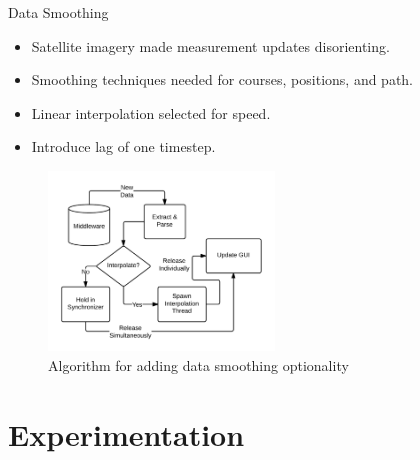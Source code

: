 \documentclass{beamer}
\begin{document}
    \begin{frame}{Data Smoothing}
          \begin{itemize} \footnotesize
            \item Satellite imagery made measurement updates disorienting.
            \item Smoothing techniques needed for courses, positions, and path.
            \item Linear interpolation selected for speed.
            \item Introduce lag of one timestep.
          \end{itemize}
          \vspace{-20pt}
          \begin{figure}[ht] \centering
            \includegraphics[width=6cm] {../graphics/middleware_diagram.png}
            \caption{\scriptsize Algorithm for adding data smoothing optionality}
          \end{figure}

    \end{frame}



\section{Experimentation}
\end{document}
